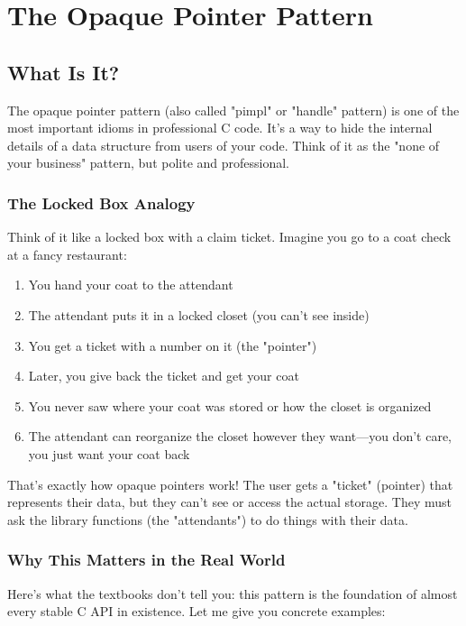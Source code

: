 \chapter{The Opaque Pointer Pattern}

\section{What Is It?}

The opaque pointer pattern (also called "pimpl" or "handle" pattern) is one of the most important idioms in professional C code. It's a way to hide the internal details of a data structure from users of your code. Think of it as the "none of your business" pattern, but polite and professional.

\subsection*{The Locked Box Analogy}

Think of it like a locked box with a claim ticket. Imagine you go to a coat check at a fancy restaurant:

\begin{enumerate}
    \item You hand your coat to the attendant
    \item The attendant puts it in a locked closet (you can't see inside)
    \item You get a ticket with a number on it (the "pointer")
    \item Later, you give back the ticket and get your coat
    \item You never saw where your coat was stored or how the closet is organized
    \item The attendant can reorganize the closet however they want---you don't care, you just want your coat back
\end{enumerate}

That's exactly how opaque pointers work! The user gets a "ticket" (pointer) that represents their data, but they can't see or access the actual storage. They must ask the library functions (the "attendants") to do things with their data.

\subsection*{Why This Matters in the Real World}

Here's what the textbooks don't tell you: this pattern is the foundation of almost every stable C API in existence. Let me give you concrete examples:

